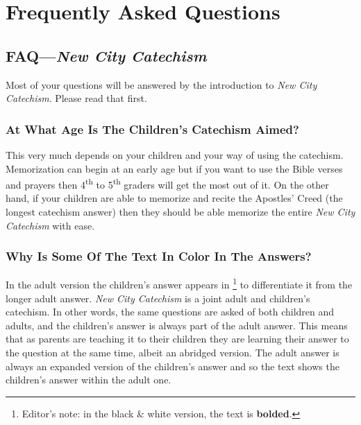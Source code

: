 


\part{Frequently Asked Questions}

\chapter{FAQ---{\em New City Catechism}}

Most of your questions will be answered by the introduction to \emph{New City Catechism}. Please read that first.

\section[At What Age Is The Children's Catechism Aimed?][Catechism For What Ages?]{At What Age Is The Children's Catechism Aimed?}

This very much depends on your children and your way of using the catechism. Memorization can begin at an early age but if you want to use the Bible verses and prayers then 4\textsuperscript{th} to 5\textsuperscript{th} graders will get the most out of it. On the other hand, if your children are able to memorize and recite the Apostles' Creed (the longest catechism answer) then they should be able memorize the entire \emph{New City Catechism}\/ with ease.

\section[Why Is Some Of The Text In Color In The Answers?][Why Is Some Text In Color?]{Why Is Some Of The Text In Color In The Answers?}

In the adult version the children's answer appears in \footnote{Editor's note: in the black \& white version, the text is \textbf{bolded}.} to differentiate it from the longer adult answer. \emph{New City Catechism}\/ is a joint adult and children's catechism. In other words, the same questions are asked of both children and adults, and the children's answer is always part of the adult answer. This means that as parents are teaching it to their children they are learning their answer to the question at the same time, albeit an abridged version. The adult answer is always an expanded version of the children's answer and so the  text shows the children's answer within the adult one.

